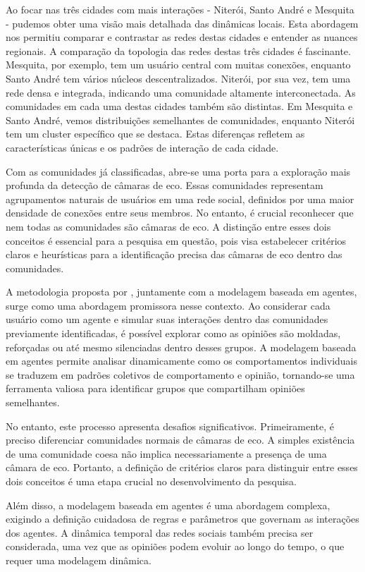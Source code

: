 Ao focar nas três cidades com mais interações - Niterói, Santo André e Mesquita - pudemos obter uma visão mais detalhada das dinâmicas locais. Esta abordagem nos permitiu comparar e contrastar as redes destas cidades e entender as nuances regionais. A comparação da topologia das redes destas três cidades é fascinante. Mesquita, por exemplo, tem um usuário central com muitas conexões, enquanto Santo André tem vários núcleos descentralizados. Niterói, por sua vez, tem uma rede densa e integrada, indicando uma comunidade altamente interconectada. As comunidades em cada uma destas cidades também são distintas. Em Mesquita e Santo André, vemos distribuições semelhantes de comunidades, enquanto Niterói tem um cluster específico que se destaca. Estas diferenças refletem as características únicas e os padrões de interação de cada cidade.

Com as comunidades já classificadas, abre-se uma porta para a exploração mais profunda da detecção de câmaras de eco. Essas comunidades representam agrupamentos naturais de usuários em uma rede social, definidos por uma maior densidade de conexões entre seus membros. No entanto, é crucial reconhecer que nem todas as comunidades são câmaras de eco. A distinção entre esses dois conceitos é essencial para a pesquisa em questão, pois visa estabelecer critérios claros e heurísticas para a identificação precisa das câmaras de eco dentro das comunidades.

A metodologia proposta por , juntamente com a modelagem baseada em agentes, surge como uma abordagem promissora nesse contexto. Ao considerar cada usuário como um agente e simular suas interações dentro das comunidades previamente identificadas, é possível explorar como as opiniões são moldadas, reforçadas ou até mesmo silenciadas dentro desses grupos. A modelagem baseada em agentes permite analisar dinamicamente como os comportamentos individuais se traduzem em padrões coletivos de comportamento e opinião, tornando-se uma ferramenta valiosa para identificar grupos que compartilham opiniões semelhantes.

No entanto, este processo apresenta desafios significativos. Primeiramente, é preciso diferenciar comunidades normais de câmaras de eco. A simples existência de uma comunidade coesa não implica necessariamente a presença de uma câmara de eco. Portanto, a definição de critérios claros para distinguir entre esses dois conceitos é uma etapa crucial no desenvolvimento da pesquisa.

Além disso, a modelagem baseada em agentes é uma abordagem complexa, exigindo a definição cuidadosa de regras e parâmetros que governam as interações dos agentes. A dinâmica temporal das redes sociais também precisa ser considerada, uma vez que as opiniões podem evoluir ao longo do tempo, o que requer uma modelagem dinâmica.

